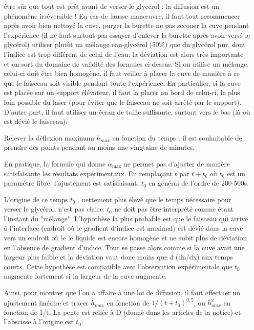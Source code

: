 \documentclass{article}%
\begin{document}
    être sûr que tout est prêt avant de verser le glycérol : la diffusion est un phénomène irréversible ! En cas de fausse manœuvre, il faut tout recommencer après avoir bien nettoyé la cuve.
    purger la burette
    ne pas secouer la cuve pendant l'expérience (il ne faut surtout pas essayer d'enlever la burette après avoir versé le glycérol)
    utiliser plutôt un mélange eau-glycérol (50\%) que du glycérol pur, dont l'indice est trop différent de celui de l'eau; la déviation est alors très importante et on sort du domaine de validité des formules ci-dessus. Si on utilise un mélange, celui-ci doit être bien homogène.
    il faut veiller à placer la cuve de manière à ce que le faisceau soit visible pendant toute l'expérience. En particulier, si la cuve est placée sur un support élévateur, il faut la placer au bord de celui-ci, le plus loin possible du laser (pour éviter que le faisceau ne soit arrêté par le support). D'autre part, il faut utiliser un écran de taille suffisante, surtout vers le bas (là où est dévié le faisceau).

Relever la déflexion maximum $h_{max}$ en fonction du temps ; il est souhaitable de prendre des points pendant au moins une vingtaine de minutes.

En pratique, la formule qui donne $\alpha_\textrm{max}$ ne permet pas d'ajuster de manière satisfaisante les résultats expérimentaux. En remplaçant $t$ par $t + t_0$ où $t_0$ est un paramètre libre, l'ajustement est satisfaisant. $t_0$ en général de l'ordre de 200-500s.

L'origine de ce temps $t_0$ , nettement plus élevé que le temps nécessaire pour verser le glycérol, n'est pas claire: $t_0$ ne doit pas être interprété comme étant l'instant du "mélange". L'hypothèse la plus probable est que le faisceau qui arrive à l'interface (endroit où le gradient d'indice est maximal) est dévié dans la cuve vers un endroit où le le liquide est encore homogène et ne subit plus de déviation en l'absence de gradient d'indice. Tout se passe alors comme si la cuve avait une largeur plus faible et la déviation vaut donc moins que d (dn/dx) aux temps courts. Cette hypothèse est compatible avec l'observation expérimentale que $t_0$ augmente fortement si la largeur de la cuve augmente.

Ainsi, pour montrer que l'on a affaire à une loi de diffusion, il faut effectuer un ajustement linéaire et tracer $h_{max}$ en fonction de $1/(t+t_{0})^{0,5}$, ou $h_{max}^{2}$ en fonction de 1/t. La pente est reliée à D (donné dans les articles de la notice) et l'abscisse à l'origine est $t_0$.
\end{document}
